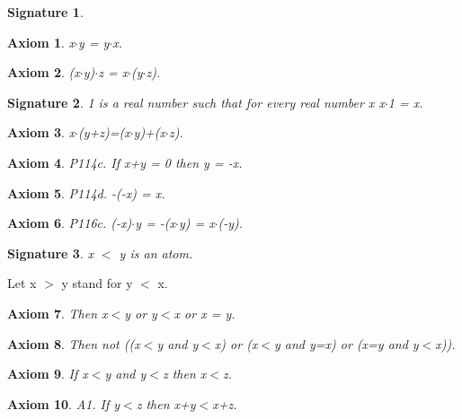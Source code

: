 \documentclass{article}
\newenvironment{forthel}{\begin{leftbar}}{\end{leftbar}}
\newtheorem{axiom}{Axiom}
\newtheorem{signature}{Signature}
\begin{document}
\begin{forthel}
\begin{signature}
\end{signature}
\begin{axiom} x$\cdot$y = y$\cdot$x.

\end{axiom}
\begin{axiom} (x$\cdot$y)$\cdot$z = x$\cdot$(y$\cdot$z).

\end{axiom}
\begin{signature} 1 is a real number such that for every real number x x$\cdot$1 = x.

\end{signature}


\begin{axiom} x$\cdot$(y+z)=(x$\cdot$y)+(x$\cdot$z).

\end{axiom}


\begin{axiom} P114c. If x+y = 0 then y = -x.

\end{axiom}
\begin{axiom} P114d. -(-x) = x.

\end{axiom}

\begin{axiom} P116c. (-x)$\cdot$y = -(x$\cdot$y) = x$\cdot$(-y).

\end{axiom}




\begin{signature} x $<$ y is an atom.

\end{signature}
Let x $>$ y stand for y $<$ x.


\begin{axiom} Then x$<$y or y$<$x or x = y.

\end{axiom}
\begin{axiom} Then not ((x$<$y and y$<$x) or (x$<$y and y=x) or (x=y and y$<$x)).

\end{axiom}
\begin{axiom} If x$<$y and y$<$z then x$<$z.

\end{axiom}







\begin{axiom} A1. If y$<$z then x+y$<$x+z.


\end{axiom}
\end{forthel}
\end{document}
